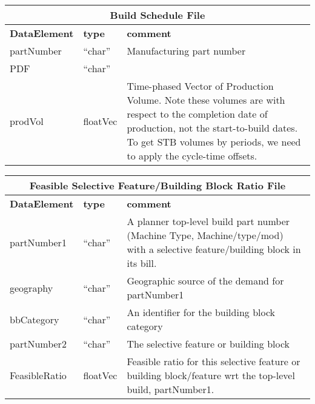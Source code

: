 \vspace{.5in}

\begin{tabular}{llp{4in}}
\multicolumn{3}{c}{{\bf Build Schedule File}}\\ \hline\hline
{\bf DataElement} &  {\bf type}  &   {\bf comment} \\ \hline
partNumber & ``char''  & Manufacturing part number \\
PDF        & ``char''  \\
prodVol    & floatVec&  Time-phased Vector of Production Volume.  Note
                      these volumes are with respect to the completion
                      date of production, not the start-to-build dates.
                      To get STB volumes by periods, we need to apply
                      the cycle-time offsets. \\
\end{tabular}

\vspace{.5in}

\begin{tabular}{llp{4in}}
\multicolumn{3}{c}{{\bf Feasible Selective Feature/Building Block Ratio File}}\\ \hline\hline
{\bf DataElement} &  {\bf type}  &   {\bf comment} \\ \hline
partNumber1  & ``char'' &       A planner top-level build part number 
                            (Machine Type, Machine/type/mod)
                            with a selective feature/building block in its bill.  \\
geography   & ``char''    &      Geographic source of the demand for partNumber1 \\
bbCategory &  ``char'' &   An identifier for the building block category  \\
partNumber2  & ``char'' &      The selective feature or building block \\

FeasibleRatio    & floatVec &   Feasible ratio for this selective feature or 
                            building block/feature wrt the top-level build, partNumber1. \\
\end{tabular}

\vspace{.5in}


